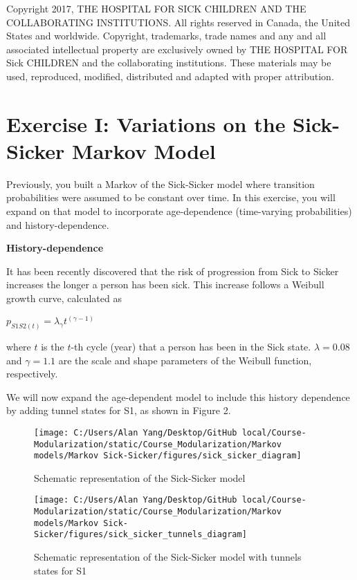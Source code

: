 \documentclass[
]{article}
\begin{document}
Copyright 2017, THE HOSPITAL FOR SICK CHILDREN AND THE COLLABORATING
INSTITUTIONS. All rights reserved in Canada, the United States and
worldwide. Copyright, trademarks, trade names and any and all associated
intellectual property are exclusively owned by THE HOSPITAL FOR Sick
CHILDREN and the collaborating institutions. These materials may be
used, reproduced, modified, distributed and adapted with proper
attribution.

\hypertarget{exercise-i-variations-on-the-sick-sicker-markov-model}{%
\section{Exercise I: Variations on the Sick-Sicker Markov
Model}\label{exercise-i-variations-on-the-sick-sicker-markov-model}}

Previously, you built a Markov of the Sick-Sicker model where transition
probabilities were assumed to be constant over time. In this exercise,
you will expand on that model to incorporate age-dependence
(time-varying probabilities) and history-dependence.

\textbf{History-dependence}

It has been recently discovered that the risk of progression from Sick
to Sicker increases the longer a person has been sick. This increase
follows a Weibull growth curve, calculated as

\(p_{S1S2(t)} = \lambda_\gamma t^{(\gamma-1)}\)

where \(t\) is the \(t\)-th cycle (year) that a person has been in the
Sick state. \(\lambda = 0.08\) and \(\gamma = 1.1\) are the scale and
shape parameters of the Weibull function, respectively.

We will now expand the age-dependent model to include this history
dependence by adding tunnel states for S1, as shown in Figure 2.

\begin{figure}

{\centering \texttt{[image: C:/Users/Alan Yang/Desktop/GitHub local/Course-Modularization/static/Course\_Modularization/Markov models/Markov Sick-Sicker/figures/sick\_sicker\_diagram]} 

}

\caption{Schematic representation of the Sick-Sicker model}\label{fig:unnamed-chunk-1}
\end{figure}

\begin{figure}

{\centering \texttt{[image: C:/Users/Alan Yang/Desktop/GitHub local/Course-Modularization/static/Course\_Modularization/Markov models/Markov Sick-Sicker/figures/sick\_sicker\_tunnels\_diagram]} 

}

\caption{Schematic representation of the Sick-Sicker model with tunnels states for S1}\label{fig:unnamed-chunk-2}
\end{figure}
\end{document}
